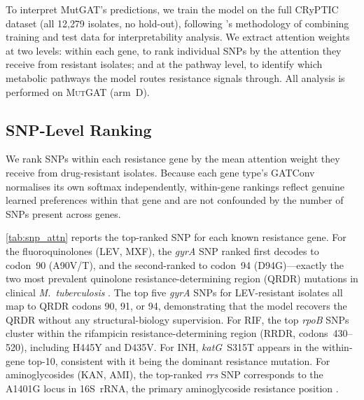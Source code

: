\documentclass{article}
\theoremstyle{plain}
\theoremstyle{definition}
\theoremstyle{remark}
\begin{document}
To interpret MutGAT's predictions, we train the model on the full CRyPTIC dataset (all 12{,}279 isolates, no hold-out), following \citet{yang2021hgat}'s methodology of combining training and test data for interpretability analysis. We extract attention weights at two levels: within each gene, to rank individual SNPs by the attention they receive from resistant isolates; and at the pathway level, to identify which metabolic pathways the model routes resistance signals through. All analysis is performed on \textsc{MutGAT} (arm~D).

\subsection{SNP-Level Ranking}
\label{sec:snp_analysis}

We rank SNPs within each resistance gene by the mean attention weight they receive from drug-resistant isolates. Because each gene type's GATConv normalises its own softmax independently, within-gene rankings reflect genuine learned preferences within that gene and are not confounded by the number of SNPs present across genes.

\cref{tab:snp_attn} reports the top-ranked SNP for each known resistance gene. For the fluoroquinolones (LEV, MXF), the \textit{gyrA} SNP ranked first decodes to codon~90 (A90V/T), and the second-ranked to codon~94 (D94G)---exactly the two most prevalent quinolone resistance-determining region (QRDR) mutations in clinical \textit{M.~tuberculosis} \citep{walker2022who}. The top five \textit{gyrA} SNPs for LEV-resistant isolates all map to QRDR codons 90, 91, or 94, demonstrating that the model recovers the QRDR without any structural-biology supervision. For RIF, the top \textit{rpoB} SNPs cluster within the rifampicin resistance-determining region (RRDR, codons~430--520), including H445Y and D435V. For INH, \textit{katG}~S315T appears in the within-gene top-10, consistent with it being the dominant resistance mutation. For aminoglycosides (KAN, AMI), the top-ranked \textit{rrs} SNP corresponds to the A1401G locus in 16S~rRNA, the primary aminoglycoside resistance position \citep{walker2022who}.
\end{document}
